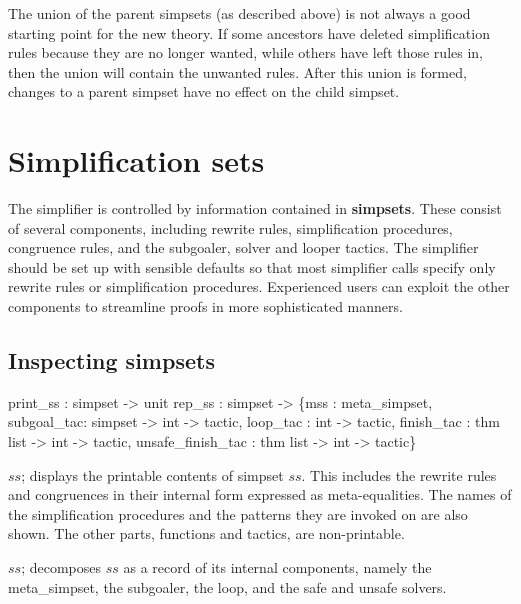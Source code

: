 \begin{warn}
  The union of the parent simpsets (as described above) is not always
  a good starting point for the new theory.  If some ancestors have
  deleted simplification rules because they are no longer wanted,
  while others have left those rules in, then the union will contain
  the unwanted rules.  After this union is formed, changes to 
  a parent simpset have no effect on the child simpset.
\end{warn}


\section{Simplification sets} 

The simplifier is controlled by information contained in {\bf
  simpsets}.  These consist of several components, including rewrite
rules, simplification procedures, congruence rules, and the subgoaler,
solver and looper tactics.  The simplifier should be set up with
sensible defaults so that most simplifier calls specify only rewrite
rules or simplification procedures.  Experienced users can exploit the
other components to streamline proofs in more sophisticated manners.

\subsection{Inspecting simpsets}
\begin{ttbox}
print_ss : simpset -> unit
rep_ss   : simpset -> \{mss        : meta_simpset, 
                       subgoal_tac: simpset  -> int -> tactic,
                       loop_tac   :             int -> tactic,
                       finish_tac : thm list -> int -> tactic,
                unsafe_finish_tac : thm list -> int -> tactic\}
\end{ttbox}
\begin{ttdescription}
  
\item[\ttindexbold{print_ss} $ss$;] displays the printable contents of
  simpset $ss$.  This includes the rewrite rules and congruences in
  their internal form expressed as meta-equalities.  The names of the
  simplification procedures and the patterns they are invoked on are
  also shown.  The other parts, functions and tactics, are
  non-printable.

\item[\ttindexbold{rep_ss} $ss$;] decomposes $ss$ as a record of its internal 
  components, namely the meta_simpset, the subgoaler, the loop, and the safe
  and unsafe solvers.

\end{ttdescription}


